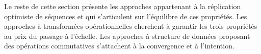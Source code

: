 Le reste de cette section présente les approches appartenant à la réplication
optimiste de séquences et qui s'articulent sur l'équilibre de ces
propriétés. Les approches à transformées opérationnelles cherchent à garantir
les trois propriétés au prix du passage à l'échelle. Les approches à structure
de données proposant des opérations commutatives s'attachent à la convergence et
à l'intention.








